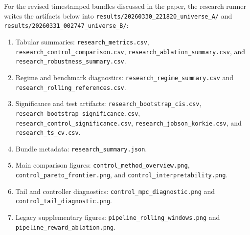 \documentclass[10pt,twocolumn]{article}
\begin{document}
For the revised timestamped bundles discussed in the paper, the research runner
writes the artifacts below into
\texttt{results/20260330\_221820\_universe\_A/} and
\texttt{results/20260331\_002747\_universe\_B/}:
\begin{enumerate}[leftmargin=1.5em, itemsep=2pt, topsep=4pt]
\item Tabular summaries:
      \texttt{research\_metrics.csv},
      \texttt{research\_control\_comparison.csv},
      \texttt{research\_ablation\_summary.csv}, and
      \texttt{research\_robustness\_summary.csv}.
\item Regime and benchmark diagnostics:
      \texttt{research\_regime\_summary.csv} and
      \texttt{research\_rolling\_references.csv}.
\item Significance and test artifacts:
      \texttt{research\_bootstrap\_cis.csv},
      \texttt{research\_bootstrap\_significance.csv},
      \texttt{research\_control\_significance.csv},
      \texttt{research\_jobson\_korkie.csv}, and
      \texttt{research\_ts\_cv.csv}.
\item Bundle metadata:
      \texttt{research\_summary.json}.
\item Main comparison figures:
      \texttt{control\_method\_overview.png},
      \texttt{control\_pareto\_frontier.png}, and
      \texttt{control\_interpretability.png}.
\item Tail and controller diagnostics:
      \texttt{control\_mpc\_diagnostic.png} and
      \texttt{control\_tail\_diagnostic.png}.
\item Legacy supplementary figures:
      \texttt{pipeline\_rolling\_windows.png} and
      \texttt{pipeline\_reward\_ablation.png}.
\end{enumerate}
\end{document}
